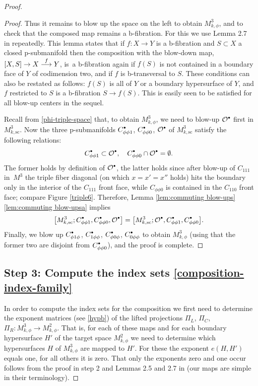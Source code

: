 \documentclass[JEP,XML,SOM,Unicode,NoFloatCountersInSection,published]{cedram}
\newcommand\To[1]{\mathchoice{\xrightarrow{\textstyle\kern4pt#1\kern3pt}}{\stackrel{#1}{\longrightarrow}}{}{}}
\newcommand{\bbullet}{{\scriptscriptstyle\bullet}}
\newcommand{\sbullet}{{\raisebox{1pt}{$\bbullet$}}}
\theoremstyle{plain}
\theoremstyle{definition}
\newcommand\calO{{\mathcal O}}
\newcommand{\ssc}{{\mathrm{sc}}}
\begin{document}
\begin{proof}
\begin{proof}
Thus it remains to blow up the space on the left to obtain $M^3_{k,\phi}$, and to check that the composed map remains a b-fibration.
For this we use Lemma 2.7 in \cite{analytic-surgery} repeatedly. This lemma states that if $f:X\to Y$ is a b-fibration and $S\subset X$ a closed p-submanifold then the composition with the blow-down map, $[X,S]\to X\To{f} Y$, is~a b-fibration again if $f(S)$ is not contained in a boundary face of $Y$ of codimension two, and if $f$ is b-transversal to $S$. These conditions can also be restated as follows: $f(S)$ is all of $Y$ or a boundary hypersurface of $Y$, and $f$ restricted to $S$ is a b-fibration $S\to f(S)$. This is easily seen to be satisfied for all blow-up centers in the sequel.

Recall from \eqref{phi-triple-space} that, to obtain $M^3_{k,\phi}$, we need to blow-up $\calO^\sbullet$ first in $M^3_{k,\ssc}$. Now the three p-submanifolds $C_{\phi\phi1}^\sbullet$, $C_{\phi\phi0}^\sbullet$, $\calO^\sbullet$ of $M^3_{k,\ssc}$ satisfy the following relations:
\[
C_{\phi\phi1}^\sbullet \subset \calO^\sbullet,\quad C_{\phi\phi0}^\sbullet \cap \calO^\sbullet = \emptyset.
\]
The former holds by definition of $\calO^\sbullet$, the latter holds since after
blow-up of $C_{111}$ in~$M^3$ the triple fiber diagonal (on which $x=x'=x''$ holds) hits the boundary only in the interior of the $C_{111}$ front face, while $C_{\phi\phi0}$ is contained in the $C_{110}$ front face;
compare Figure
\ref{triple6}.
Therefore,
Lemma \ref{lem:commuting blow-ups}\eqref{lem:commuting blow-upsa} implies
\[
\bigl[M^{3}_{k,\ssc}; C_{\phi\phi1}^\sbullet,
C_{\phi\phi0}^\sbullet,\calO^\sbullet\bigr] = \bigl[M^{3}_{k,\ssc}; \calO^\sbullet, C_{\phi\phi1}^\sbullet,
C_{\phi\phi0}^\sbullet\bigr].
\]
Finally, we blow up $C_{\phi1\phi}^\sbullet$, $C_{1\phi\phi}^\sbullet$, $C_{\phi0\phi}^\sbullet$, $C_{0\phi\phi}^\sbullet$ to obtain $M^3_{k,\phi}$ (using that the former two are disjoint from $C_{\phi\phi0}^\sbullet$), and the proof is complete.
\end{proof}

\subsection*{Step 3: Compute the index sets \eqref{composition-index-family}}
In order to compute the index sets for the composition we first need to determine the exponent matrices (see \eqref{hypb}) of the lifted projections $\Pi_L$, $\Pi_C$, $\Pi_R: M^3_{k,\phi}\to M^2_{k,\phi}$. That is, for each of these maps and for each boundary hypersurface $H'$ of the target space $M^2_{k,\phi}$ we need to determine which hypersurfaces $H$ of $M^3_{k,\phi}$ are mapped to $H'$. For these the exponent $e(H,H')$ equals one, for all others it is zero. That only the exponents zero and one occur follows from the proof in step 2 and Lemmas 2.5 and 2.7 in \cite{analytic-surgery} (our maps are simple in their terminology).


\end{proof}
\end{document}
